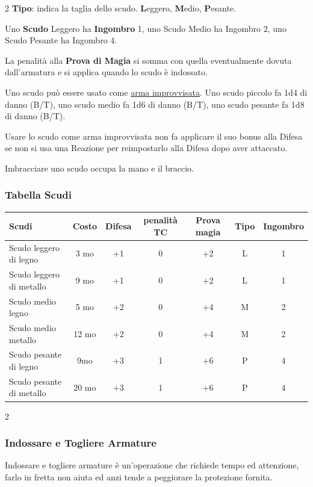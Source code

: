 \begin{multicols}{2}
\textbf{Tipo}: indica la taglia dello scudo. \textbf{L}eggero, \textbf{M}edio, \textbf{P}esante.

Uno \textbf{Scudo} Leggero ha \textbf{Ingombro} 1, uno Scudo Medio ha Ingombro 2, uno Scudo Pesante ha Ingombro 4.

La penalità alla \textbf{Prova di Magia} si somma con quella eventualmente dovuta dall'armatura e si applica quando lo scudo è indossato.

Uno scudo può essere usato come \hyperlink{armaimprovvisata}{arma improvvisata}. Uno scudo piccolo fa 1d4 di danno (B/T), uno scudo medio fa 1d6 di danno (B/T), uno scudo pesante fa 1d8 di danno (B/T).

Usare lo scudo come arma improvvisata non fa applicare il suo bonus alla Difesa se non si usa una Reazione per reimpostarlo alla Difesa dopo aver attaccato.

Imbracciare uno scudo occupa la mano e il braccio.

\end{multicols}

\subsubsection{Tabella Scudi}

\label{tabella-scudi}

\noindent\begin{tabular}{lcccccc}
	\toprule
\rowcolor{gray!20}\textbf{Scudi} & \textbf{Costo} & \textbf{Difesa} & \textbf{penalità TC} & \textbf{Prova magia} & \textbf{Tipo} & \textbf{Ingombro}\\
\toprule
Scudo leggero di legno& 3 mo&+1& 0& +2& L & 1\\
\rowcolor{gray!20}Scudo leggero di metallo & 9 mo&+1& 0& +2& L& 1\\
Scudo medio legno &5 mo &+2& 0& +4& M& 2\\
\rowcolor{gray!20}Scudo medio metallo&12 mo&+2& 0& +4& M& 2\\
Scudo pesante di legno & 9mo&+3 & 1& +6& P& 4\\
\rowcolor{gray!20}Scudo pesante di metallo & 20 mo&+3& 1& +6& P& 4\\
\end{tabular}

\begin{multicols}{2}

\subsubsection{Indossare e Togliere Armature}

Indossare e togliere armature è un'operazione che richiede tempo ed attenzione, farlo in fretta non aiuta ed anzi tende a peggiorare la protezione fornita.

\end{multicols}


